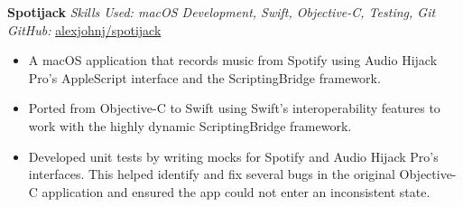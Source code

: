 \textbf{Spotijack}  \newline
\textit{Skills Used: macOS Development, Swift, Objective-C, Testing, Git}\\
\textit{GitHub:} \href{https://github.com/\myweb/spotijack}{alexjohnj/spotijack}
\begin{itemize}[leftmargin=0mm]
\item A macOS application that records music from Spotify using Audio Hijack
  Pro's AppleScript interface and the ScriptingBridge framework.
\item Ported from Objective-C to Swift using Swift's interoperability features
  to work with the highly dynamic ScriptingBridge framework.
\item Developed unit tests by writing mocks for Spotify and Audio Hijack Pro's
  interfaces. This helped identify and fix several bugs in the original
  Objective-C application and ensured the app could not enter an inconsistent
  state.
\end{itemize}


